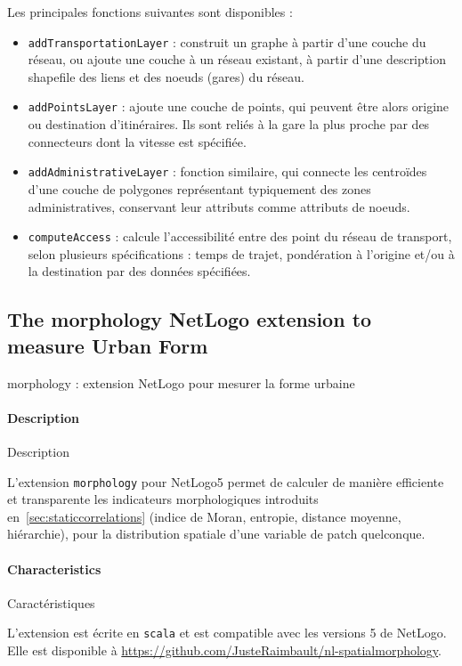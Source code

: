 Les principales fonctions suivantes sont disponibles :
\begin{itemize}
	\item \texttt{addTransportationLayer} : construit un graphe à partir d'une couche du réseau, ou ajoute une couche à un réseau existant, à partir d'une description shapefile des liens et des noeuds (gares) du réseau.
	\item \texttt{addPointsLayer} : ajoute une couche de points, qui peuvent être alors origine ou destination d'itinéraires. Ils sont reliés à la gare la plus proche par des connecteurs dont la vitesse est spécifiée.
	\item \texttt{addAdministrativeLayer} : fonction similaire, qui connecte les centroïdes d'une couche de polygones représentant typiquement des zones administratives, conservant leur attributs comme attributs de noeuds.
	\item \texttt{computeAccess} : calcule l'accessibilité entre des point du réseau de transport, selon plusieurs spécifications : temps de trajet, pondération à l'origine et/ou à la destination par des données spécifiées.
\end{itemize}



\subsection{The morphology NetLogo extension to measure Urban Form}{morphology : extension NetLogo pour mesurer la forme urbaine}

\label{app:subsec:morphologyextension}

\paragraph{Description}{Description}

L'extension \texttt{morphology} pour NetLogo5 permet de calculer de manière efficiente et transparente les indicateurs morphologiques introduits en~\ref{sec:staticcorrelations} (indice de Moran, entropie, distance moyenne, hiérarchie), pour la distribution spatiale d'une variable de patch quelconque.

\paragraph{Characteristics}{Caractéristiques}

L'extension est écrite en \texttt{scala} et est compatible avec les versions 5 de NetLogo. Elle est disponible à \url{https://github.com/JusteRaimbault/nl-spatialmorphology}.



